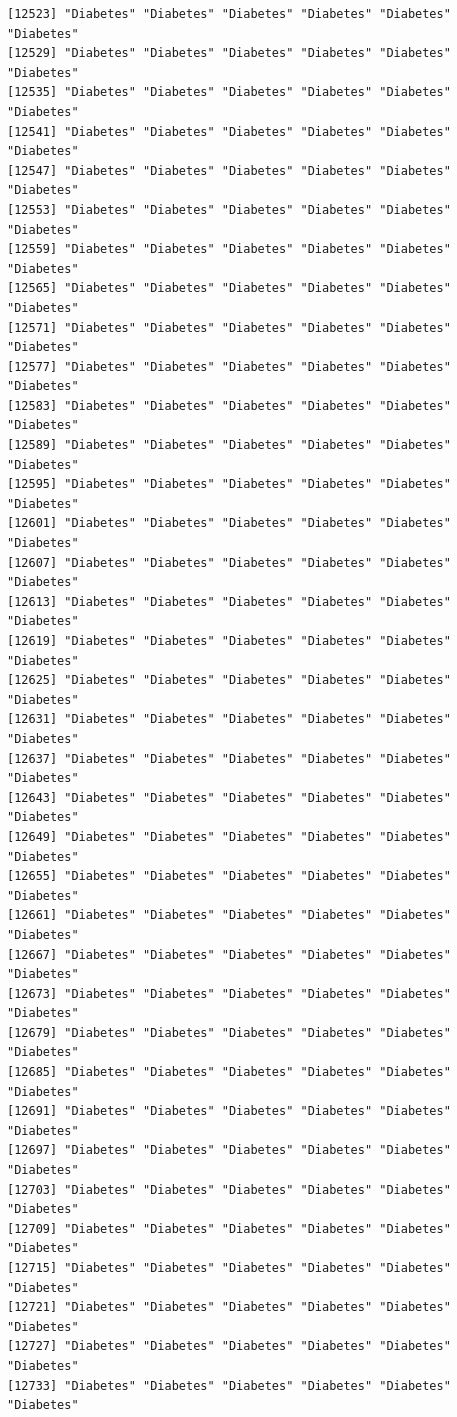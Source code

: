 \documentclass[
  letterpaper,
  DIV=11,
  numbers=noendperiod]{scrartcl}
\begin{document}
\begin{verbatim}
[12523] "Diabetes" "Diabetes" "Diabetes" "Diabetes" "Diabetes" "Diabetes"
[12529] "Diabetes" "Diabetes" "Diabetes" "Diabetes" "Diabetes" "Diabetes"
[12535] "Diabetes" "Diabetes" "Diabetes" "Diabetes" "Diabetes" "Diabetes"
[12541] "Diabetes" "Diabetes" "Diabetes" "Diabetes" "Diabetes" "Diabetes"
[12547] "Diabetes" "Diabetes" "Diabetes" "Diabetes" "Diabetes" "Diabetes"
[12553] "Diabetes" "Diabetes" "Diabetes" "Diabetes" "Diabetes" "Diabetes"
[12559] "Diabetes" "Diabetes" "Diabetes" "Diabetes" "Diabetes" "Diabetes"
[12565] "Diabetes" "Diabetes" "Diabetes" "Diabetes" "Diabetes" "Diabetes"
[12571] "Diabetes" "Diabetes" "Diabetes" "Diabetes" "Diabetes" "Diabetes"
[12577] "Diabetes" "Diabetes" "Diabetes" "Diabetes" "Diabetes" "Diabetes"
[12583] "Diabetes" "Diabetes" "Diabetes" "Diabetes" "Diabetes" "Diabetes"
[12589] "Diabetes" "Diabetes" "Diabetes" "Diabetes" "Diabetes" "Diabetes"
[12595] "Diabetes" "Diabetes" "Diabetes" "Diabetes" "Diabetes" "Diabetes"
[12601] "Diabetes" "Diabetes" "Diabetes" "Diabetes" "Diabetes" "Diabetes"
[12607] "Diabetes" "Diabetes" "Diabetes" "Diabetes" "Diabetes" "Diabetes"
[12613] "Diabetes" "Diabetes" "Diabetes" "Diabetes" "Diabetes" "Diabetes"
[12619] "Diabetes" "Diabetes" "Diabetes" "Diabetes" "Diabetes" "Diabetes"
[12625] "Diabetes" "Diabetes" "Diabetes" "Diabetes" "Diabetes" "Diabetes"
[12631] "Diabetes" "Diabetes" "Diabetes" "Diabetes" "Diabetes" "Diabetes"
[12637] "Diabetes" "Diabetes" "Diabetes" "Diabetes" "Diabetes" "Diabetes"
[12643] "Diabetes" "Diabetes" "Diabetes" "Diabetes" "Diabetes" "Diabetes"
[12649] "Diabetes" "Diabetes" "Diabetes" "Diabetes" "Diabetes" "Diabetes"
[12655] "Diabetes" "Diabetes" "Diabetes" "Diabetes" "Diabetes" "Diabetes"
[12661] "Diabetes" "Diabetes" "Diabetes" "Diabetes" "Diabetes" "Diabetes"
[12667] "Diabetes" "Diabetes" "Diabetes" "Diabetes" "Diabetes" "Diabetes"
[12673] "Diabetes" "Diabetes" "Diabetes" "Diabetes" "Diabetes" "Diabetes"
[12679] "Diabetes" "Diabetes" "Diabetes" "Diabetes" "Diabetes" "Diabetes"
[12685] "Diabetes" "Diabetes" "Diabetes" "Diabetes" "Diabetes" "Diabetes"
[12691] "Diabetes" "Diabetes" "Diabetes" "Diabetes" "Diabetes" "Diabetes"
[12697] "Diabetes" "Diabetes" "Diabetes" "Diabetes" "Diabetes" "Diabetes"
[12703] "Diabetes" "Diabetes" "Diabetes" "Diabetes" "Diabetes" "Diabetes"
[12709] "Diabetes" "Diabetes" "Diabetes" "Diabetes" "Diabetes" "Diabetes"
[12715] "Diabetes" "Diabetes" "Diabetes" "Diabetes" "Diabetes" "Diabetes"
[12721] "Diabetes" "Diabetes" "Diabetes" "Diabetes" "Diabetes" "Diabetes"
[12727] "Diabetes" "Diabetes" "Diabetes" "Diabetes" "Diabetes" "Diabetes"
[12733] "Diabetes" "Diabetes" "Diabetes" "Diabetes" "Diabetes" "Diabetes"

\end{verbatim}
\end{document}
